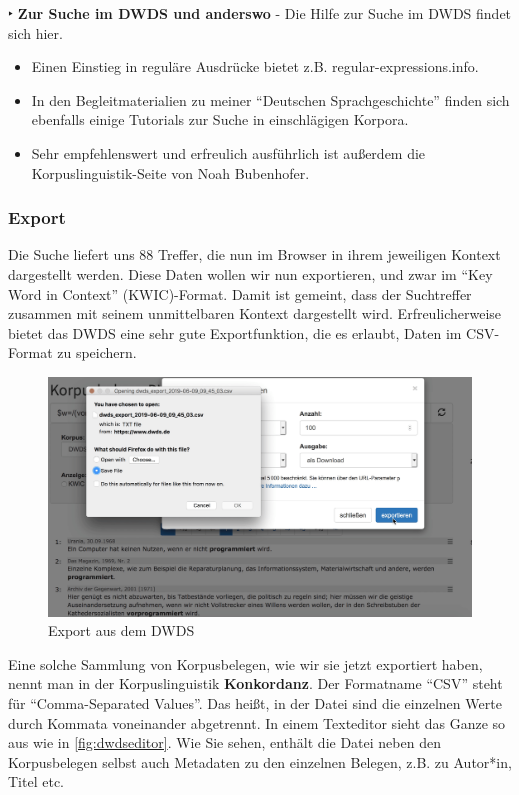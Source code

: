 \documentclass[]{article}
\begin{document}
 ‣ \textbf{Zur Suche im DWDS und anderswo} - Die Hilfe zur Suche im DWDS
findet sich hier.

\begin{itemize}
\item
  Einen Einstieg in reguläre Ausdrücke bietet z.B.
  regular-expressions.info.
\item
  In den Begleitmaterialien zu meiner \enquote{Deutschen
  Sprachgeschichte} finden sich ebenfalls einige Tutorials zur Suche in
  einschlägigen Korpora.
\item
  Sehr empfehlenswert und erfreulich ausführlich ist außerdem die
  Korpuslinguistik-Seite von Noah Bubenhofer. 
\end{itemize}

\subsubsection{Export}\label{export}

Die Suche liefert uns 88 Treffer, die nun im Browser in ihrem jeweiligen
Kontext dargestellt werden. Diese Daten wollen wir nun exportieren, und
zwar im \enquote{Key Word in Context} (KWIC)-Format. Damit ist gemeint,
dass der Suchtreffer zusammen mit seinem unmittelbaren Kontext
dargestellt wird. Erfreulicherweise bietet das DWDS eine sehr gute
Exportfunktion, die es erlaubt, Daten im CSV-Format zu speichern.

\begin{figure}
\includegraphics[width=5.37in]{docs/fig/dwdsdownload} \caption{Export aus dem DWDS}\label{fig:dwdsexp}
\end{figure}

Eine solche Sammlung von Korpusbelegen, wie wir sie jetzt exportiert
haben, nennt man in der Korpuslinguistik \textbf{Konkordanz}. Der
Formatname \enquote{CSV} steht für \enquote{Comma-Separated Values}. Das
heißt, in der Datei sind die einzelnen Werte durch Kommata voneinander
abgetrennt. In einem Texteditor sieht das Ganze so aus wie in
\ref{fig:dwdseditor}. Wie Sie sehen, enthält die Datei neben den
Korpusbelegen selbst auch Metadaten zu den einzelnen Belegen, z.B. zu
Autor*in, Titel etc.
\end{document}
